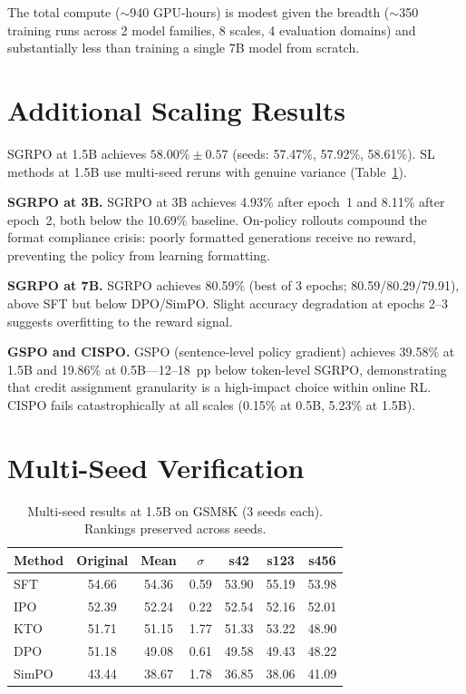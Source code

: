 \documentclass{article}
\begin{document}
The total compute ($\sim$940 GPU-hours) is modest given the breadth ($\sim$350 training runs across 2 model families, 8 scales, 4 evaluation domains) and substantially less than training a single 7B model from scratch.

\section{Additional Scaling Results}
\label{app:scaling}

SGRPO at 1.5B achieves $58.00\% \pm 0.57$ (seeds: 57.47\%, 57.92\%, 58.61\%).
SL methods at 1.5B use multi-seed reruns with genuine variance (Table~\ref{tab:seedfix}).

\textbf{SGRPO at 3B.}
SGRPO at 3B achieves 4.93\% after epoch~1 and 8.11\% after epoch~2, both below the 10.69\% baseline. On-policy rollouts compound the format compliance crisis: poorly formatted generations receive no reward, preventing the policy from learning formatting.

\textbf{SGRPO at 7B.}
SGRPO achieves 80.59\% (best of 3 epochs; 80.59/80.29/79.91), above SFT but below DPO/SimPO. Slight accuracy degradation at epochs 2--3 suggests overfitting to the reward signal.

\textbf{GSPO and CISPO.}
GSPO (sentence-level policy gradient) achieves 39.58\% at 1.5B and 19.86\% at 0.5B---12--18~pp below token-level SGRPO, demonstrating that credit assignment granularity is a high-impact choice within online RL.
CISPO fails catastrophically at all scales (0.15\% at 0.5B, 5.23\% at 1.5B).

\section{Multi-Seed Verification}
\label{app:seed_invariance}

\begin{table}[ht]
\centering
\caption{Multi-seed results at 1.5B on GSM8K (3 seeds each). Rankings preserved across seeds.}
\label{tab:seedfix}
\small
\begin{tabular}{@{}lcccccc@{}}
\toprule
\textbf{Method} & \textbf{Original} & \textbf{Mean} & \textbf{$\sigma$} & \textbf{s42} & \textbf{s123} & \textbf{s456} \\
\midrule
SFT & 54.66 & 54.36 & 0.59 & 53.90 & 55.19 & 53.98 \\
IPO & 52.39 & 52.24 & 0.22 & 52.54 & 52.16 & 52.01 \\
KTO & 51.71 & 51.15 & 1.77 & 51.33 & 53.22 & 48.90 \\
DPO & 51.18 & 49.08 & 0.61 & 49.58 & 49.43 & 48.22 \\
SimPO & 43.44 & 38.67 & 1.78 & 36.85 & 38.06 & 41.09 \\
\bottomrule
\end{tabular}
\end{table}
\end{document}
